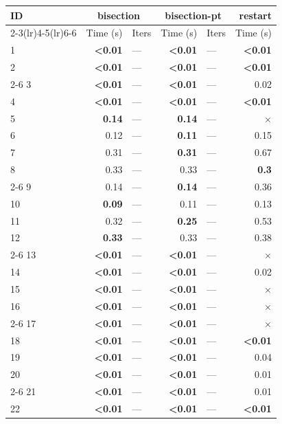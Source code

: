 \begin{longtable}{lr@{\hskip 4pt}l@{\hskip 12pt}r@{\hskip 4pt}l@{\hskip 12pt}r}
\toprule
ID & \multicolumn{2}{c}{bisection} & \multicolumn{2}{c}{bisection-pt} & restart \\
\cmidrule(lr){2-3}\cmidrule(lr){4-5}\cmidrule(lr){6-6}
 & Time (s) &  Iters & Time (s) &  Iters & Time (s) \\
\midrule
\endhead
1 & \textbf{<0.01} & --- & \textbf{<0.01} & --- & \textbf{<0.01} \\
2 & \textbf{<0.01} & --- & \textbf{<0.01} & --- & \textbf{<0.01} \\
\cmidrule{2-6}
3 & \textbf{<0.01} & --- & \textbf{<0.01} & --- & 0.02 \\
4 & \textbf{<0.01} & --- & \textbf{<0.01} & --- & \textbf{<0.01} \\
\midrule
5 & \textbf{0.14} & --- & \textbf{0.14} & --- & $\times$ \\
6 & 0.12 & --- & \textbf{0.11} & --- & 0.15 \\
7 & 0.31 & --- & \textbf{0.31} & --- & 0.67 \\
8 & 0.33 & --- & 0.33 & --- & \textbf{0.3} \\
\cmidrule{2-6}
9 & 0.14 & --- & \textbf{0.14} & --- & 0.36 \\
10 & \textbf{0.09} & --- & 0.11 & --- & 0.13 \\
11 & 0.32 & --- & \textbf{0.25} & --- & 0.53 \\
12 & \textbf{0.33} & --- & 0.33 & --- & 0.38 \\
\cmidrule{2-6}
13 & \textbf{<0.01} & --- & \textbf{<0.01} & --- & $\times$ \\
14 & \textbf{<0.01} & --- & \textbf{<0.01} & --- & 0.02 \\
15 & \textbf{<0.01} & --- & \textbf{<0.01} & --- & $\times$ \\
16 & \textbf{<0.01} & --- & \textbf{<0.01} & --- & $\times$ \\
\cmidrule{2-6}
17 & \textbf{<0.01} & --- & \textbf{<0.01} & --- & $\times$ \\
18 & \textbf{<0.01} & --- & \textbf{<0.01} & --- & \textbf{<0.01} \\
19 & \textbf{<0.01} & --- & \textbf{<0.01} & --- & 0.04 \\
20 & \textbf{<0.01} & --- & \textbf{<0.01} & --- & 0.01 \\
\cmidrule{2-6}
21 & \textbf{<0.01} & --- & \textbf{<0.01} & --- & 0.01 \\
22 & \textbf{<0.01} & --- & \textbf{<0.01} & --- & \textbf{<0.01} \\

\end{longtable}
